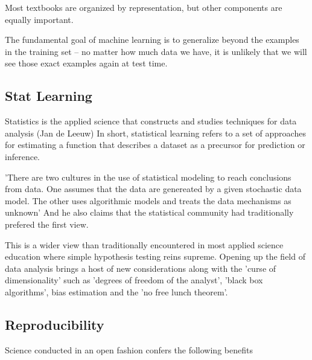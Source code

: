 Most textbooks are organized by representation, but other components are equally important.\cite{Domingos2012}

The fundamental goal of machine learning is to generalize beyond the examples in the training set -- no matter how much data we have, it is unlikely that we will see those exact examples again at test time.\cite{Domingos2012}



\subsection{Stat Learning}

Statistics is the applied science that constructs and studies techniques for data analysis (Jan de Leeuw) In short, statistical learning refers to a set of approaches for estimating a function that describes a dataset as a precursor for prediction or inference.\cite{James2013}

'There are two cultures in the use of statistical modeling to reach conclusions from data. One assumes that the data are genereated by a given stochastic data model. The other uses algorithmic models and treats the data mechanisms as unknown' \cite{Breiman2001} And he also claims that the statistical community had traditionally prefered the first view.

This is a wider view than traditionally encountered in most applied science education where simple hypothesis testing reins supreme. Opening up the field of data analysis brings a host of new considerations along with the 'curse of dimensionality' such as 'degrees of freedom of the analyst', 'black box algorithms', bias estimation and the 'no free lunch theorem'.\cite{Boulesteix2014}

\subsection{Reproducibility}

Science conducted in an open fashion confers the following benefits

